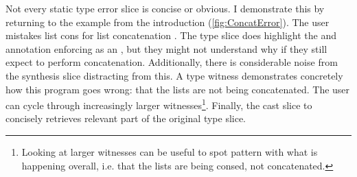 Not every static type error slice is concise or obvious. I demonstrate this by returning to the example from the introduction (\cref{fig:ConcatError}). The user mistakes list cons \code{::} for list concatenation . The type slice does highlight the \code{::} and annotation enforcing  as an , but they might not understand why if they still expect \code{::} to perform concatenation. Additionally, there is considerable noise from the synthesis slice distracting from this. A type witness demonstrates concretely how this program goes wrong: that the lists are not being concatenated. The user can cycle through increasingly larger witnesses\footnote{Looking at larger witnesses can be useful to spot pattern with what is happening overall, i.e. that the lists are being consed, not concatenated.}. Finally, the cast slice to  concisely retrieves relevant part of the original type slice.
